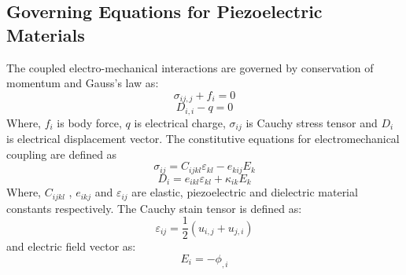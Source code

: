 \documentclass[12pt]{article}
\begin{document}
\subsection{Governing Equations for Piezoelectric Materials}
The coupled electro-mechanical interactions are governed by conservation of momentum and Gauss's law as:
\begin{equation} \label{MechEq}
\sigma_{ij,j} + f_i = 0
\end{equation} 
\begin{equation} \label{ElecEq}
D_{i,i} - q = 0
\end{equation}
Where, $ f_i $ is body force, $ q $ is electrical charge, $ \sigma_{ij} $ is Cauchy stress tensor and $ D_i $ is electrical displacement vector.
The constitutive equations for electromechanical coupling are defined as
\begin{equation}
\sigma_{ij} = C_{ijkl} \varepsilon_{kl} - e_{kij} E_k
\end{equation}
\begin{equation}
D_i = e_{ikl} \varepsilon_{kl} + \kappa_{ik} E_k
\end{equation}
Where, $ C_{ijkl} $ , $ e_{ikj} $ and $ \varepsilon_{ij} $ are elastic, piezoelectric and dielectric material constants respectively. The Cauchy stain tensor is defined as:
\begin{equation}
\varepsilon_{ij} = \frac{1}{2} (u_{i,j} + u_{j,i})
\end{equation}
and electric field vector as:
\begin{equation}
E_i = -\phi_{,i}
\end{equation}
\end{document}
